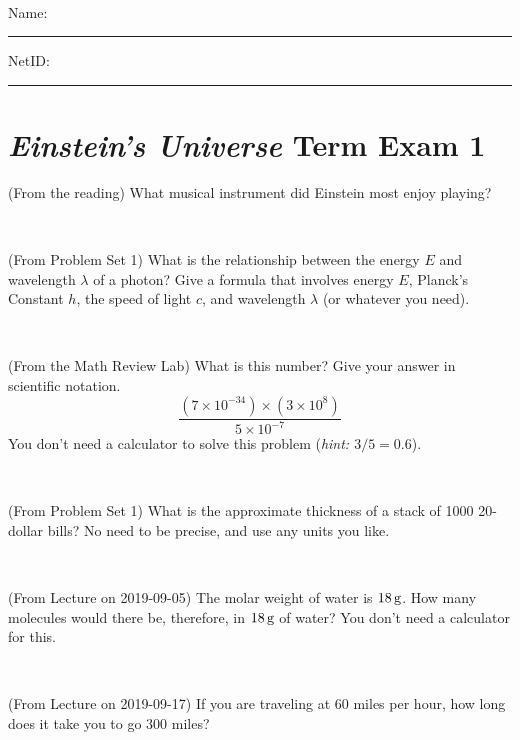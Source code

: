 \documentclass[12pt, letterpaper]{article}
\begin{document}
\vfill ~


\cleardoublepage



\noindent
Name: \rule[-1ex]{0.60\textwidth}{0.1pt}
NetID: \rule[-1ex]{0.20\textwidth}{0.1pt}

\section*{\textsl{Einstein's Universe} Term Exam 1}
\setcounter{problem}{1}


\begin{problem} (From the reading)
What musical instrument did Einstein most enjoy playing?
\end{problem}


\vfill ~

\begin{problem} (From Problem Set 1)
What is the relationship between the energy $E$ and wavelength
$\lambda$ of a photon? Give a formula that involves energy $E$,
Planck's Constant $h$, the speed of light $c$, and wavelength
$\lambda$ (or whatever you need).
\end{problem}

\vfill ~

\begin{problem} (From the Math Review Lab)
What is this number? Give your answer in scientific notation.
$$
\frac{(7\times10^{-34})\times(3\times10^8)}{5\times10^{-7}}
$$
You don't need a calculator to solve this problem (\textit{hint: $3/5=0.6$}).
\end{problem}


\vfill ~

\begin{problem} (From Problem Set 1)
What is the approximate thickness of a stack of 1000 20-dollar bills?
No need to be precise, and use any units you like.
\end{problem}


\vfill ~


\clearpage


\begin{problem} (From Lecture on 2019-09-05)
The molar weight of water is $18\,\mathrm{g}$. How many molecules would there
be, therefore, in $18\,\mathrm{g}$ of water? You don't need a calculator for
this.
\end{problem}


\vfill ~

\begin{problem} (From Lecture on 2019-09-17)
If you are traveling at 60 miles per hour, how long does
it take you to go 300 miles?
\end{problem}
\end{document}
